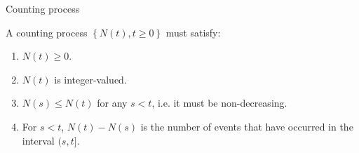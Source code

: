 \documentclass[11pt]{beamer}
\begin{document}
\begin{frame}{Counting process}

\noindent A counting process $\left\{ N\left( t\right) ,t\geq 0\right\} $
must satisfy:

\begin{enumerate}
\item $N\left( t\right) \geq 0$.

\vfill

\item $N\left( t\right) $ is integer-valued.

\vfill

\item $N\left( s\right) \leq N\left( t\right) $ for any $s<t$, i.e. it must
be non-decreasing.

\vfill

\item For $s<t$, $N\left( t\right) -N\left( s\right) $ is the number of
events that have occurred in the interval $(s,t].$\newpage
\end{enumerate}

\end{frame}
\end{document}

